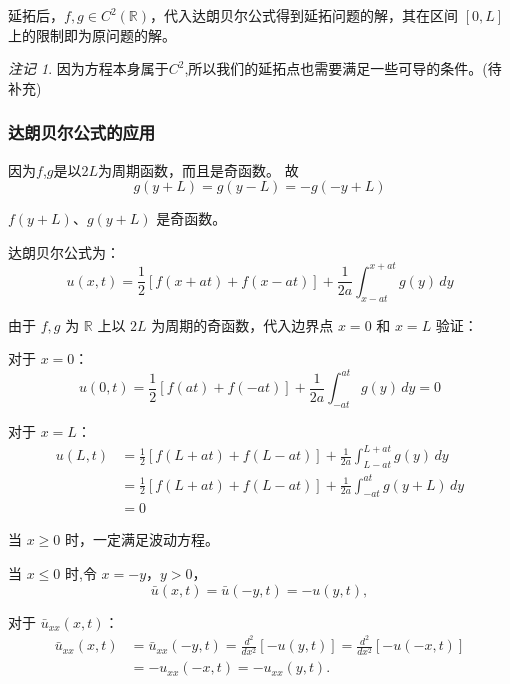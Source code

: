 \documentclass[12pt,a4paper]{article}
\numberwithin{subsection}{section}   %
\numberwithin{subsubsection}{subsection}
\theoremstyle{plain}
\theoremstyle{definition}
\theoremstyle{remark}
\newtheorem{remark}[theorem]{注记}
\theoremstyle{remark}
\begin{document}
延拓后，\(f, g \in C^2(\mathbb{R})\)，代入达朗贝尔公式得到延拓问题的解，其在区间 \([0, L]\) 上的限制即为原问题的解。

\begin{remark}
因为方程本身属于$C^2$,所以我们的延拓点也需要满足一些可导的条件。(待补充)
\end{remark}


\subsubsection{达朗贝尔公式的应用}
因为$f$,$g$是以$2L$为周期函数，而且是奇函数。
故
\begin{equation}
g(y + L) = g(y - L) = -g(-y + L)
\end{equation}

$f(y + L)$、$g(y + L)$ 是奇函数。



达朗贝尔公式为：
\begin{equation}
	u(x,t) = \frac{1}{2} \left[ f(x + at) + f(x - at) \right] + \frac{1}{2a} \int_{x - at}^{x + at} g(y) \, dy
\end{equation}

由于 \(f, g\) 为 \(\mathbb{R}\) 上以 \(2L\) 为周期的奇函数，代入边界点 \(x = 0\) 和 \(x = L\) 验证：

对于 \(x = 0\)：
\begin{equation}
	u(0, t) = \frac{1}{2} \left[ f(at) + f(-at) \right] + \frac{1}{2a} \int_{-at}^{at} g(y) \, dy = 0
\end{equation}

对于 \(x = L\)：
\begin{equation}
	\begin{aligned}
		u(L, t) &= \frac{1}{2}[f(L + at) + f(L - at)] + \frac{1}{2a} \int_{L - at}^{L + at} g(y) \, dy \\
		&= \frac{1}{2}[f(L + at) + f(L - at)] + \frac{1}{2a} \int_{-at}^{at} g(y + L) \, dy \\
		&= 0
	\end{aligned}
\end{equation}

	当 \(x \geq 0\) 时，一定满足波动方程。

当 \(x \leq 0\) 时,令 \(x = -y\)，\(y > 0\)，
\[
\bar{u}(x, t) = \bar{u}(-y, t) = -u(y, t),
\]

对于 \(\bar{u}_{xx}(x, t)\)：
\[
\begin{aligned}
	\bar{u}_{xx}(x, t) &= \bar{u}_{xx}(-y, t) = \frac{d^2}{dx^2} [-u(y, t)] = \frac{d^2}{dx^2} [-u(-x, t)] \\
	&= -u_{xx}(-x, t) = -u_{xx}(y, t).
\end{aligned}
\]
\end{document}
